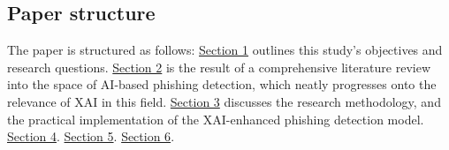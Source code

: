 \subsection*{Paper structure}

The paper is structured as follows: \hyperref[sec:1-introduction]{Section 1} outlines this study's objectives and research questions. \hyperref[sec:2-literature-review]{Section 2} is the result of a comprehensive literature review into the space of AI-based phishing detection, which neatly progresses onto the relevance of XAI in this field. \hyperref[sec:3-research-methodology]{Section 3} discusses the research methodology, and the practical implementation of the XAI-enhanced phishing detection model. \hyperref[sec:4-results]{Section 4}. \hyperref[sec:5-discussion]{Section 5}. \hyperref[sec:6-conclusion]{Section 6}.

